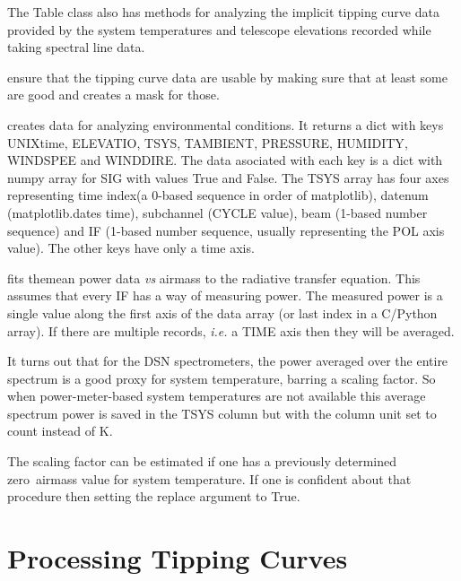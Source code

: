 \documentclass[letterpaper,11pt]{book}
\begin{document}
The {\ttfamily Table} class also has methods for analyzing the implicit tipping
curve data provided by the system temperatures and telescope elevations recorded
while taking spectral line data.
\begin{description}\itemsep0pt \parskip0pt 
\item[{\ttfamily validate\_wx\_data()}] ensure that the tipping curve data are 
usable by making sure that at least some are good and creates a mask for those.
\item[{\ttfamily get\_wx\_datacubes()}] creates data for analyzing environmental 
conditions. It returns a dict with keys {\ttfamily UNIXtime}, 
{\ttfamily ELEVATIO}, {\ttfamily TSYS}, {\ttfamily TAMBIENT}, 
{\ttfamily PRESSURE}, {\ttfamily HUMIDITY}, {\ttfamily WINDSPEE} and
{\ttfamily WINDDIRE}. The data asociated with each key is a dict with numpy 
array for {\ttfamily SIG} with values
{\ttfamily True} and {\ttfamily False}.  The {\ttfamily TSYS} array has four 
axes representing time index(a 0-based sequence in order of matplotlib), 
datenum ({\ttfamily matplotlib.dates} time), subchannel (CYCLE value), beam
(1-based number sequence) and IF (1-based number sequence, usually representing
the POL axis value). The other keys have only a time axis.
\item[{\ttfamily fit\_mean\_power\_to\_airmass(Tvac\_func, first=0, last=None,
replace=False)}] fits the\linebreak mean power data {\itshape vs} airmass to the 
radiative transfer equation. This assumes that every IF has a way of measuring 
power. The measured power is a single value along the first axis of the data 
array (or last index in a C/Python array).  If there are multiple records,
{\itshape i.e.} a {\ttfamily TIME} axis then they will be averaged.
\end{description}
It turns out that for the DSN spectrometers, the power averaged over the entire
spectrum is a good proxy for system temperature, barring a scaling factor. So
when power-meter-based system temperatures are not available this average 
spectrum power is saved in the {\ttfamily TSYS} column but with the column unit
set to {\ttfamily count} instead of {K}.

The scaling factor can be estimated if one has a previously determined 
zero~airmass value for system temperature. If one is confident about that
procedure then setting the {\ttfamily replace} argument to {\ttfamily True}.

\section{Processing Tipping Curves}
\end{document}
